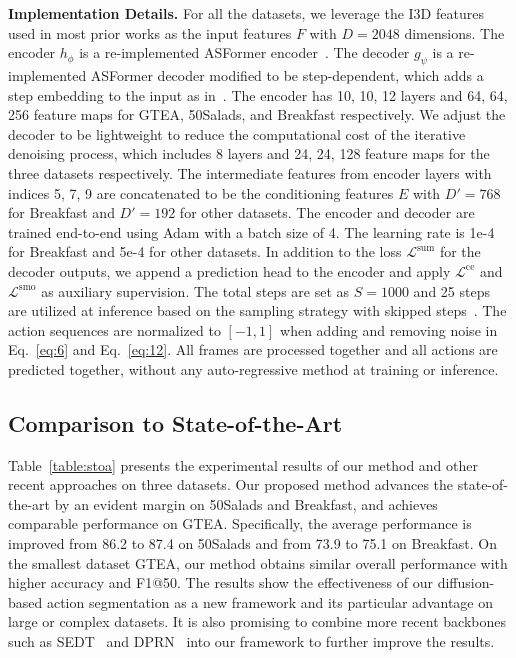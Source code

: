 \documentclass[10pt,twocolumn,letterpaper]{article}
\begin{document}
\textbf{Implementation Details.}
For all the datasets, we leverage the I3D features~\cite{I3D} used in most prior works as the input features $F$ with $D{=}2048$ dimensions.
The encoder $h_\phi$ is a re-implemented ASFormer encoder~\cite{2021_BMVC_Yi}.
The decoder $g_\psi$ is a re-implemented ASFormer decoder modified to be step-dependent, which adds a step embedding to the input as in~\cite{DDPM}.
The encoder has 10, 10, 12 layers and 64, 64, 256 feature maps for GTEA, 50Salads, and Breakfast respectively.
We adjust the decoder to be lightweight to reduce the computational cost of the iterative denoising process, which includes 8 layers and 24, 24, 128 feature maps for the three datasets respectively.
The intermediate features from encoder layers with indices 5, 7, 9 are concatenated to be the conditioning features $E$ with $D'{=}768$ for Breakfast and $D'{=}192$ for other datasets.
The encoder and decoder are trained end-to-end using Adam with a batch size of 4.
The learning rate is 1e-4 for Breakfast and 5e-4 for other datasets.
In addition to the loss $\mathcal{L}^{\mathrm{sum}}$ for the decoder outputs, we append a prediction head to the encoder and apply $\mathcal{L}^{\mathrm{ce}}$ and $\mathcal{L}^{\mathrm{smo}}$ as auxiliary supervision.
The total steps are set as $S{=}1000$ and 25 steps are utilized at inference based on the sampling strategy with skipped steps~\cite{DDIM}.
The action sequences are normalized to $[-1, 1]$ when adding and removing noise in Eq.~\ref{eq:6} and Eq.~\ref{eq:12}.
All frames are processed together and all actions are predicted together, without any auto-regressive method at training or inference.




\subsection{Comparison to State-of-the-Art}

Table~\ref{table:stoa} presents the experimental results of our method and other recent approaches on three datasets.
Our proposed method advances the state-of-the-art by an evident margin on 50Salads and Breakfast, and achieves comparable performance on GTEA.
Specifically, the average performance is improved from 86.2 to 87.4 on 50Salads and from 73.9 to 75.1 on Breakfast.
On the smallest dataset GTEA, our method obtains similar overall performance with higher accuracy and F1@50.
The results show the effectiveness of our diffusion-based action segmentation as a new framework and its particular advantage on large or complex datasets.
It is also promising to combine more recent backbones such as SEDT~\cite{2022_EL_Kim} and DPRN~\cite{2022_PR_Park} into our framework to further improve the results.
\end{document}
